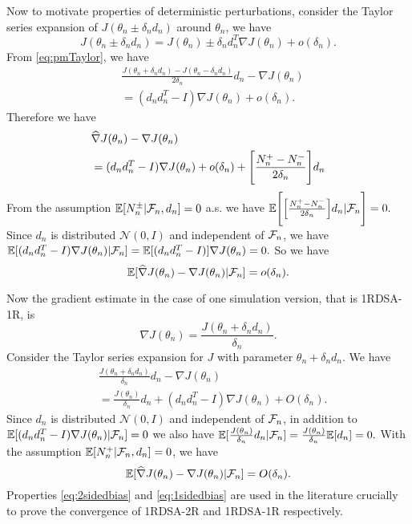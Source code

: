 \documentclass[letterpaper, 10 pt, conference]{ieeeconf}  %
\begin{document}
Now to motivate properties of deterministic perturbations, consider the Taylor series expansion of $J(\theta_n \pm \delta_nd_n)$ around
$\theta_n$, we have
 \begin{equation} \label{eq:pmTaylor}
 J(\theta_n \pm \delta_nd_n)=
 J(\theta_n) \pm \delta_nd_n^T \nabla J(\theta_n)+o(\delta_n).
\end{equation}
From \eqref{eq:pmTaylor}, we have
\begin{align*}\label{eq:Taylor}
&\frac{J(\theta_n+\delta_n d_n)-J(\theta_n-\delta_n d_n)}{2\delta_n}d_n
 - \nabla J(\theta_n) \\
&= (d_nd_n^T-I)\nabla J(\theta_n)+o(\delta_n).
\end{align*}
Therefore we have 
\begin{align*}& \widehat\nabla J(\theta_n)-\nabla J(\theta_n)\\
&=(d_nd_n^T-I)\nabla J(\theta_n)+o(\delta_n)+\Bigg{[}\frac{N_{n}^{+}-N_{n}^{-}}{2\delta_n}\Bigg{]}d_n
\end{align*}
From the assumption  $\mathbb{E}[N_{n}^{\pm}| \mathcal{F}_n,d_n] = 0$ a.s. we have
$\mathbb{E}\Bigg{[}\Big{[}\frac{N_{n}^{+}-N_{n}^{-}}{2\delta_n}\Big{]}d_n| \mathcal{F}_n\Bigg{]}=0.$
Since $d_n$ is distributed $\mathcal{N}(0,I)$ and independent of $\mathcal{F}_n$, we have 
$\mathbb{E}[(d_nd_n^T-I)\nabla J(\theta_n)|\mathcal{F}_n]=\mathbb{E}[(d_nd_n^T-I)]\nabla J(\theta_n)=0.$
So we have 
\begin{equation}\label{eq:2sidedbias}
\mathbb{E}[\widehat\nabla J(\theta_n)-\nabla J(\theta_n)|\mathcal{F}_n]=o(\delta_n).
\end{equation}

Now the gradient estimate in the case of one simulation version, that is 1RDSA-1R, is 
$$\nabla J(\theta_n)=\frac{J(\theta_n+\delta_n d_n)}{\delta_n}.$$ Consider the Taylor series 
expansion for $J$ 
with parameter $\theta_n+\delta_n d_n.$ We have
\begin{align*}
&\frac{J(\theta_n+\delta_n d_n)}{\delta_n}d_n
- \nabla J(\theta_n) \\
&=\frac{J(\theta_n)}{\delta_n}d_n
+(d_nd_n^T-I)\nabla J(\theta_n)+O(\delta_n).
\end{align*}
Since $d_n$ is distributed $\mathcal{N}(0,I)$ and independent of $\mathcal{F}_n$, in addition 
to $\mathbb{E}[(d_nd_n^T-I)\nabla J(\theta_n)|\mathcal{F}_n]=0$ we also have
$\mathbb{E}[\frac{J(\theta_n)}{\delta_n}d_n|\mathcal{F}_n]=\frac{J(\theta_n)}{\delta_n}\mathbb{E}[d_n]=0.$
With the assumption $\mathbb{E}[N_n^+|\mathcal{F}_n,d_n]=0$, we have
\begin{equation}\label{eq:1sidedbias}
\mathbb{E}[\widehat\nabla J(\theta_n)-\nabla J(\theta_n)|\mathcal{F}_n]=O(\delta_n).
\end{equation}
Properties \eqref{eq:2sidedbias} and \eqref{eq:1sidedbias} are used in the literature crucially to 
prove the convergence of 1RDSA-2R and 1RDSA-1R respectively.
\end{document}
